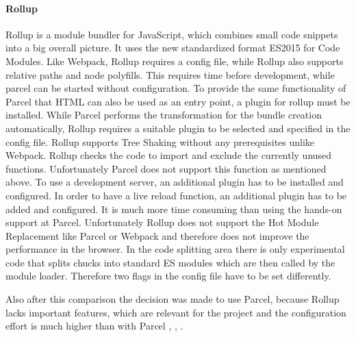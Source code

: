 \paragraph{Rollup}
\label{par:tecRollup}
Rollup is a module bundler for JavaScript, which combines small code snippets into a big overall picture. It uses the new standardized format ES2015 for Code Modules. Like Webpack, Rollup requires a config file, while Rollup also supports relative paths and node polyfills. This requires time before development, while parcel can be started without configuration. To provide the same functionality of Parcel that HTML can also be used as an entry point, a plugin for rollup must be installed. While Parcel performs the transformation for the bundle creation automatically, Rollup requires a suitable plugin to be selected and specified in the config file.  Rollup supports Tree Shaking without any prerequisites unlike Webpack. Rollup checks the code to import and exclude the currently unused functions. Unfortunately Parcel does not support this function as mentioned above. To use a development server, an additional plugin has to be installed and configured. In order to have a live reload function, an additional plugin has to be added and configured. It is much more time consuming than using the hands-on support at Parcel. Unfortunately Rollup does not support the Hot Module Replacement like Parcel or Webpack and therefore does not improve the performance in the browser. In the code splitting area there is only experimental code that splits chucks into standard ES modules which are then called by the module loader. Therefore two flags in the config file have to be set differently.

Also after this comparison the decision was made to use Parcel, because Rollup lacks important features, which are relevant for the project and the configuration effort is much higher than with Parcel \cite{Bhatia2018}, \cite{WebpackAuthors2019}, \cite{rollupJs-Authors2019}. 

